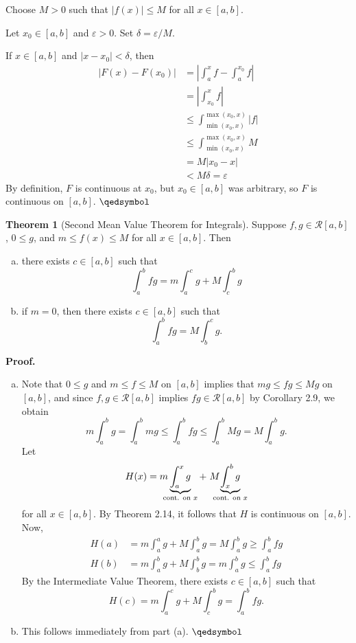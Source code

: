 \documentclass[11pt]{article}
\theoremstyle{definition}
\newtheorem{thm}{Theorem}[section]
\begin{document}
Choose $M > 0$ such that $|f(x)| \leq M$ for all $x \in [a, b]$. 

Let $x_0 \in [a, b]$ and $\varepsilon > 0$. Set $\delta = \varepsilon / M$. 

If $x \in [a, b]$ and $|x - x_0| < \delta$, then
\begin{align*}
|F(x) - F(x_0)| & = \left|\int_a^x f - \int_a^{x_0} f \right| \\
& = \left|\int_{x_0}^x f\right| \\
& \leq \int_{\min(x_0, x)}^{\max(x_0, x)} |f| \\
& \leq \int_{\min(x_0, x)}^{\max(x_0, x)} M \\
& = M|x_0 - x| \\
& < M\delta = \varepsilon
\end{align*}
By definition, $F$ is continuous at $x_0$, but $x_0 \in [a, b]$ was arbitrary, so $F$ is continuous on $[a, b]$. $\qedsymbol$

\begin{thm}[Second Mean Value Theorem for Integrals]
Suppose $f, g \in \mathcal{R}[a, b]$, $0 \leq g$, and $m \leq f(x) \leq M$ for all $x \in [a, b]$. Then
\begin{enumerate}[(a)] \vspace{-0.2cm}
\item there exists $c \in [a, b]$ such that
$$\int_a^b fg = m \int_a^c g + M \int_c^b g$$
\item if $m = 0$, then there exists $c \in [a, b]$ such that
$$\int_a^b fg = M \int_b^c g \text{.}$$
\end{enumerate}
\end{thm}
\textbf{Proof.} 
\begin{enumerate}[(a)] \vspace{-0.2cm}
\item Note that $0 \leq g$ and $m \leq f \leq M$ on $[a, b]$ implies that $mg \leq fg \leq Mg$ on $[a, b]$, and since $f, g \in \mathcal{R}[a, b]$ implies $fg \in \mathcal{R}[a, b]$ by Corollary 2.9, we obtain
$$m \int_a^b g = \int_a^b mg \leq \int_a^b fg \leq \int_a^b Mg = M\int_a^b g \text{.}$$
Let 
$$H(x) = m\hspace{-7pt}\underbrace{\int_a^x g}_{\text{cont. on $x$}} + \hspace{3pt} M\hspace{-9pt}\underbrace{\int_x^b g}_{\text{cont. on $x$}}$$
for all $x \in [a, b]$. By Theorem 2.14, it follows that $H$ is continuous on $[a, b]$. Now,
\begin{align*}
H(a) & = m\int_a^a g + M\int_a^b g = M\int_a^b g \geq \int_a^b fg \\
H(b) & = m\int_a^b g + M\int_b^b g = m\int_a^b g \leq \int_a^b fg
\end{align*}
By the Intermediate Value Theorem, there exists $c \in [a, b]$ such that
$$H(c) = m\int_a^c g + M\int_c^b g = \int_a^b fg \text{.}$$
\item This follows immediately from part (a). $\qedsymbol$
\end{enumerate}
\end{document}
